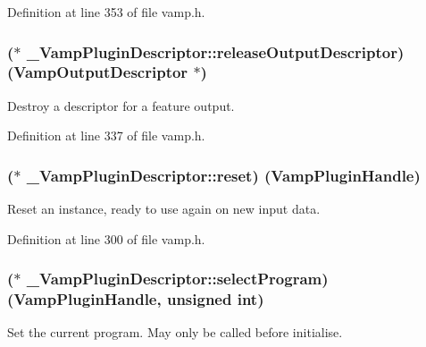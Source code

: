 Definition at line 353 of file vamp.\+h.

\subsubsection[{\texorpdfstring{release\+Output\+Descriptor}{releaseOutputDescriptor}}]{($\ast$ \+\_\+\+Vamp\+Plugin\+Descriptor\+::release\+Output\+Descriptor) ({\bf Vamp\+Output\+Descriptor} $\ast$)}\hypertarget{struct___vamp_plugin_descriptor_a69f9fef2ed20a88985c960de4428cecb}{}\label{struct___vamp_plugin_descriptor_a69f9fef2ed20a88985c960de4428cecb}
Destroy a descriptor for a feature output. 

Definition at line 337 of file vamp.\+h.

\subsubsection[{\texorpdfstring{reset}{reset}}]{($\ast$ \+\_\+\+Vamp\+Plugin\+Descriptor\+::reset) ({\bf Vamp\+Plugin\+Handle})}\hypertarget{struct___vamp_plugin_descriptor_a0bb0a037c2cb6baf3abac6b03d4a0009}{}\label{struct___vamp_plugin_descriptor_a0bb0a037c2cb6baf3abac6b03d4a0009}
Reset an instance, ready to use again on new input data. 

Definition at line 300 of file vamp.\+h.

\subsubsection[{\texorpdfstring{select\+Program}{selectProgram}}]{($\ast$ \+\_\+\+Vamp\+Plugin\+Descriptor\+::select\+Program) ({\bf Vamp\+Plugin\+Handle}, unsigned {\bf int})}\hypertarget{struct___vamp_plugin_descriptor_a688596d8abcdd638250799314ef9cb19}{}\label{struct___vamp_plugin_descriptor_a688596d8abcdd638250799314ef9cb19}
Set the current program. May only be called before initialise. 

